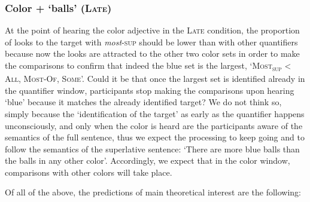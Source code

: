 \documentclass[output=paper]{langscibook}
\begin{document}
\subsubsection{Color + `balls' (\textsc{Late})}

At the point of hearing the color adjective in the \textsc{Late} condition, the proportion of looks to the target with
\textit{most}\textsc{-sup} should be lower than with other quantifiers because now the looks are attracted to the
other two color sets in order to make the comparisons to confirm that indeed the blue set is the largest,
`\textsc{Most\textsubscript{sup}} {\textless} \textsc{All}, \textsc{Most-Of}, \textsc{Some}'. Could it be that once the
largest set is identified already in the quantifier window, participants stop making the comparisons upon hearing `blue' because it matches the already identified target? We do not think so, simply because the `identification of the target' as early as the quantifier happens unconsciously, and only when the color is heard are the participants aware of the semantics of the full sentence, thus we expect the processing to keep going and to follow the semantics of the
superlative sentence: `There are more blue balls than the balls in any other color'. Accordingly, we expect that in the color window, comparisons with other colors will take place.

Of all of the above, the predictions of main theoretical interest are the following: 
\end{document}
